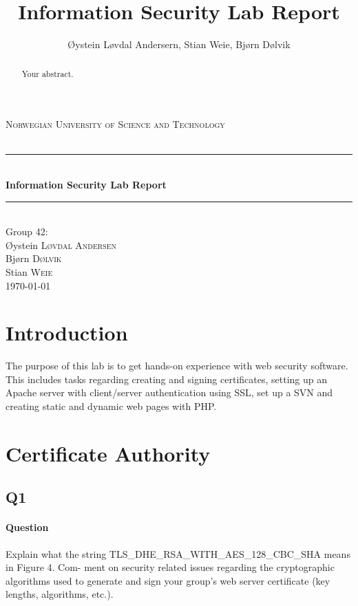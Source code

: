 \documentclass[11pt, a4paper]{article}
\title{Information Security Lab Report}
\author{Øystein Løvdal Andersern, Stian Weie, Bjørn Dølvik}
\newcommand{\HRule}{\rule{\linewidth}{0.5mm}}
\begin{document}
\begin{titlepage}
\begin{center}

\textsc{\LARGE Norwegian University of Science and Technology}\\[1.5cm]

\textsc{\Large }\\[0.5cm]

\HRule \\[0.4cm]
{ \huge \bfseries Information Security Lab Report \\[0.4cm] }

\HRule \\[1.5cm]

{\large Group 42:}\\[0.5cm]

Øystein \textsc{Løvdal Andersen}\\
Bjørn \textsc{Dølvik}\\
Stian \textsc{Weie}\\[4.0cm]

{\large \today}

\end{center}
\end{titlepage}

\begin{abstract}
Your abstract.
\end{abstract}
\tableofcontents
\clearpage

\section{Introduction}
The purpose of this lab is to get hands-on experience with web security software. This includes tasks regarding creating and signing certificates, setting up an Apache server with client/server authentication using SSL, set up a SVN and creating static and dynamic web pages with PHP. 
\section{Certificate Authority}
\subsection{Q1}
\paragraph{Question}
Explain what the string TLS\_DHE\_RSA\_WITH\_AES\_128\_CBC\_SHA means in Figure 4. Com-
ment on security related issues regarding the cryptographic algorithms used to generate and
sign your group’s web server certificate (key lengths, algorithms, etc.).
\end{document}

